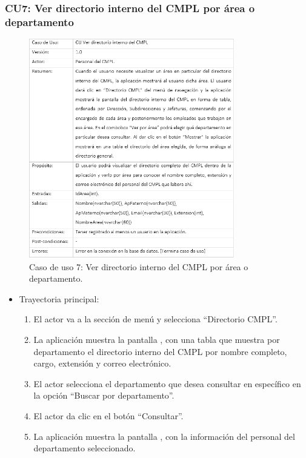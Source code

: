 		\subsubsection{CU7: Ver directorio interno del CMPL por área o departamento}
			\begin{figure}[htbp!]
				\centering
					\includegraphics[width=0.8\textwidth]{images/CU/CU7}
					\caption{Caso de uso 7: Ver directorio interno del CMPL por área o departamento.}
				\label{Tabla}
			\end{figure}
			
			\begin{itemize}
				\item Trayectoria principal:
					\begin{enumerate}
						\item El actor va a la sección de menú y selecciona ``Directorio CMPL''.
						\item La aplicación muestra la pantalla , con una tabla que muestra por departamento el directorio interno del CMPL por nombre completo, cargo, extensión y correo electrónico.
						\item El actor selecciona el departamento que desea consultar en específico en la opción ``Buscar por departamento''.
						\item El actor da clic en el botón ``Consultar''.
						\item La aplicación muestra la pantalla , con la información del personal del departamento seleccionado. 
					\end{enumerate}
			\end{itemize}
			
